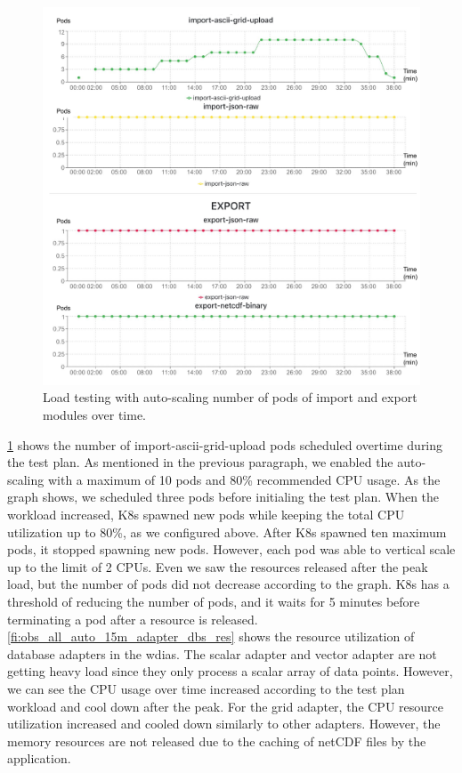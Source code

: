 \begin{figure}[htp]
    \centering
    \includegraphics[width=1.0\textwidth]{results/obs/all_auto/obs_all_auto_15m_import_export_pods.pdf}
    \caption{Load testing with auto-scaling number of pods of import and export modules over time.}
    \label{fi:obs_all_auto_15m_import_export_pods}
\end{figure}

\cref{fi:obs_all_auto_15m_import_export_pods} shows the number of import-ascii-grid-upload pods scheduled overtime during the test plan. As mentioned in the previous paragraph, we enabled the auto-scaling with a maximum of 10 pods and 80\% recommended CPU usage. As the graph shows, we scheduled three pods before initialing the test plan. When the workload increased, K8s spawned new pods while keeping the total CPU utilization up to 80\%, as we configured above. After K8s spawned ten maximum pods, it stopped spawning new pods. However, each pod was able to vertical scale up to the limit of 2 CPUs. Even we saw the resources released after the peak load, but the number of pods did not decrease according to the graph. K8s has a threshold of reducing the number of pods, and it waits for 5 minutes before terminating a pod after a resource is released. \cref{fi:obs_all_auto_15m_adapter_dbs_res} shows the resource utilization of database adapters in the \acrshort{wdias}. The scalar adapter and vector adapter are not getting heavy load since they only process a scalar array of data points. However, we can see the CPU usage over time increased according to the test plan workload and cool down after the peak. For the grid adapter, the CPU resource utilization increased and cooled down similarly to other adapters. However, the memory resources are not released due to the caching of netCDF files by the application.

